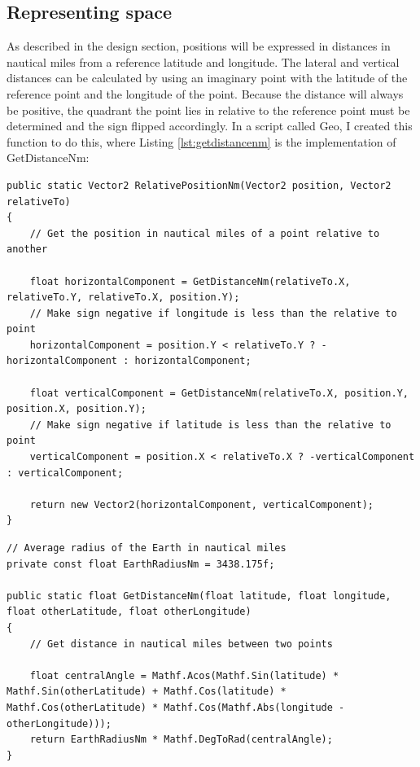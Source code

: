 \documentclass{article}
\begin{document}
\subsection{Representing space}
As described in the design section, positions will be expressed in distances in nautical miles from a reference latitude and longitude.
The lateral and vertical distances can be calculated by using an imaginary point with the latitude of the reference point and the longitude of the point.
Because the distance will always be positive, the \gls{quadrant} the point lies in relative to the reference point must be determined and the sign flipped accordingly.
In a script called Geo, I created this function to do this, where Listing \ref{lst:getdistancenm} is the implementation of GetDistanceNm:
\lstset{style=csharp}
\begin{lstlisting}[caption=Calculating the position of a point relative to another]
public static Vector2 RelativePositionNm(Vector2 position, Vector2 relativeTo)
{
    // Get the position in nautical miles of a point relative to another

    float horizontalComponent = GetDistanceNm(relativeTo.X, relativeTo.Y, relativeTo.X, position.Y);
    // Make sign negative if longitude is less than the relative to point
    horizontalComponent = position.Y < relativeTo.Y ? -horizontalComponent : horizontalComponent;

    float verticalComponent = GetDistanceNm(relativeTo.X, position.Y, position.X, position.Y);
    // Make sign negative if latitude is less than the relative to point
    verticalComponent = position.X < relativeTo.X ? -verticalComponent : verticalComponent;

    return new Vector2(horizontalComponent, verticalComponent);
}
\end{lstlisting}
\lstset{style=csharp}
\begin{lstlisting}[label={lst:getdistancenm},caption=Function to calculate great-circle distance using the spherical law of cosines]
// Average radius of the Earth in nautical miles
private const float EarthRadiusNm = 3438.175f;

public static float GetDistanceNm(float latitude, float longitude, float otherLatitude, float otherLongitude)
{
    // Get distance in nautical miles between two points

    float centralAngle = Mathf.Acos(Mathf.Sin(latitude) * Mathf.Sin(otherLatitude) + Mathf.Cos(latitude) * Mathf.Cos(otherLatitude) * Mathf.Cos(Mathf.Abs(longitude - otherLongitude)));
    return EarthRadiusNm * Mathf.DegToRad(centralAngle);
}
\end{lstlisting}
\end{document}
